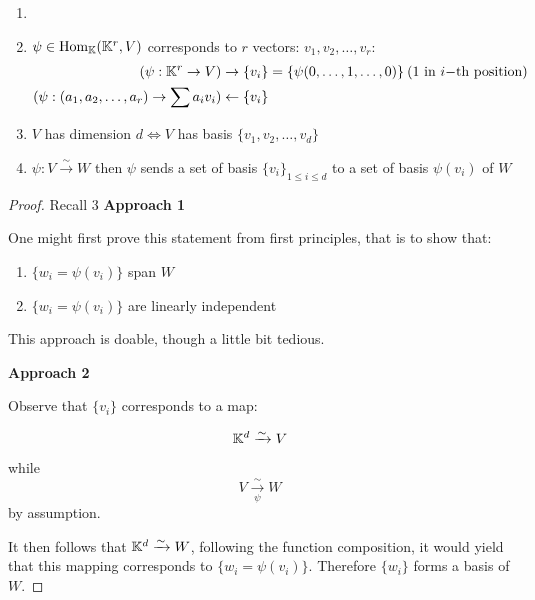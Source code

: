
\begin{recall}
    \begin{enumerate}
        \item[]
        \item \(\psi \in \mathrm{Hom}_{\mathbb{K}}(\mathbb{K}^r, V)\) corresponds to \(r\) vectors: \(v_1, v_2, \dots, v_r\):
              \begin{align*}
                  (\psi: \mathbb{K}^r \to V)                                      & \rightarrow \{v_i\} = \{\psi(0, \dots, 1, \dots, 0)\} \:\text{(1 in \(i-\)th position)}\: \\
                  \left(\psi: (a_1, a_2, \dots, a_r\right) \to \sum a_iv_i) & \leftarrow \{v_i\}
              \end{align*}
        \item \(V\) has dimension \(d \Leftrightarrow V\) has basis \(\{v_1, v_2, \dots, v_d\}\)
        \item \(\psi: V \xrightarrow{\sim} W\) then \(\psi\) sends a set of basis \(\{v_i\}_{1\leq i \leq d}\) to a set of basis \(\psi(v_i)\) of \(W\)
    \end{enumerate}
\end{recall}

\begin{proof} {Recall 3}
    \textbf{Approach 1}

    One might first prove this statement from first principles, that is to show that:
    \begin{enumerate}
        \item \(\{w_i = \psi(v_i)\}\) span \(W\)
        \item \(\{w_i = \psi(v_i)\}\) are linearly independent
    \end{enumerate}
    This approach is doable, though a little bit tedious.

    \textbf{Approach 2}

    Observe that \(\{v_i\}\) corresponds to a map:

    \[
        \mathbb{K}^d \xrightarrow{\sim} V
    \]

    while \[
        V \xrightarrow[\psi]{\sim} W
    \]
    by assumption.

    It then follows that \(\mathbb{K}^d \xrightarrow{\sim} W\), following the function composition, it would yield that this mapping corresponds to \(\{w_i = \psi(v_i)\}\). Therefore \(\{w_i\}\) forms a basis of \(W\).
\end{proof}

